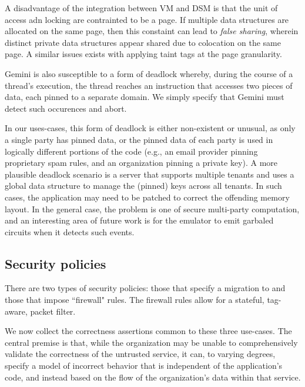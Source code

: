 %
A disadvantage of the integration between VM and DSM is that the unit of access
adn locking are contrainted to be a page.
%
If multiple data structures are allocated on the same page, then this constaint
can lead to \emph{false sharing}, wherein distinct private data structures
appear shared due to colocation on the same page.
%
A similar issues exists with applying taint tags at the page granularity.


Gemini is also susceptible to a form of deadlock whereby, during the course of
a thread's execution, the thread reaches an instruction that accesses two
pieces of data, each pinned to a separate domain.
%
We simply specify that Gemini must detect such occurences and abort.


In our uses-cases, this form of deadlock is either non-existent or unusual, as
only a single party has pinned data, or the pinned data of each party is used 
in logically different portions of the code (e.g., an email provider pinning
proprietary spam rules, and an organization pinning a private key).
%
A more plausible deadlock scenario is a server that supports multiple tenants
and uses a global data structure to manage the (pinned) keys across all
tenants.
%
In such cases, the application may need to be patched to correct the offending
memory layout.
%
In the general case, the problem is one of secure multi-party computation, and
an interesting area of future work is for the emulator to emit garbaled
circuits when it detects such events.


\subsection{Security policies}

There are two types of security policies: those that specify a migration to
and those that impose ``firewall" rules.
%
The firewall rules allow for a stateful, tag-aware, packet filter.

We now collect the correctness assertions common to these three use-cases.
%
The central premise is that, while the organization may be unable to
comprehensively validate the correctness of the untrusted service, it can, to
varying degrees, specify a model of incorrect behavior that is independent of the
application's code, and instead based on the flow of the organization's data
within that service. 

